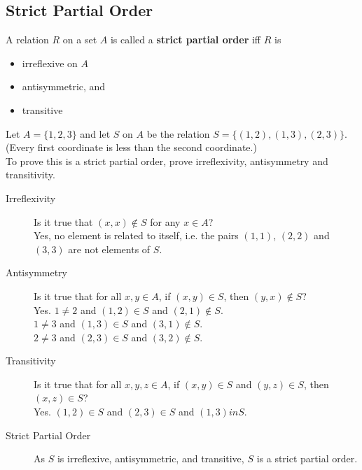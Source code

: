 \documentclass[../notes.tex]{subfiles}
\begin{document}
			\subsection{Strict Partial Order}
				A relation $R$ on a set $A$ is called a \textbf{strict partial order} iff $R$ is
				\begin{itemize}
					\item irreflexive on $A$
					\item antisymmetric, and
					\item transitive
				\end{itemize}
				\begin{example}
					Let $A = \{1, 2, 3\}$ and let $S$ on $A$ be the relation $S = \bigl\{(1, 2), (1, 3), (2, 3)\bigr\}$. (Every first coordinate is less than the second coordinate.)\\
					To prove this is a strict partial order, prove irreflexivity, antisymmetry and transitivity.
					\begin{description}
						\item[Irreflexivity] Is it true that $(x, x) \notin S$ for any $x \in A$?\\
							Yes, no element is related to itself, i.e. the pairs $(1, 1)$, $(2, 2)$ and $(3, 3)$ are not elements of $S$.
						\item[Antisymmetry] Is it true that for all $x, y \in A$, if $(x, y) \in S$, then $(y, x) \notin S$?\\
							Yes. $1 \neq 2$ and $(1, 2) \in S$ and $(2, 1) \notin S$.\\
							$1 \neq 3$ and $(1, 3) \in S$ and $(3, 1) \notin S$.\\
							$2 \neq 3$ and $(2, 3) \in S$ and $(3, 2) \notin S$.
						\item[Transitivity] Is it true that for all $x, y, z \in A$, if $(x, y) \in S$ and $(y, z) \in S$, then $(x, z) \in S$?\\
							Yes. $(1, 2) \in S$ and $(2, 3) \in S$ and $(1, 3) in S$.
						\item[Strict Partial Order] As $S$ is irreflexive, antisymmetric, and transitive, $S$ is a strict partial order.
					\end{description}
				\end{example}
\end{document}
